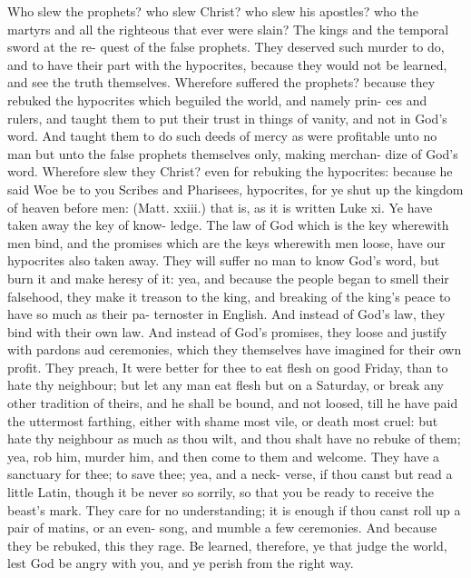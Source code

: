 \documentclass{custom}
\begin{document}
Who slew the prophets? who slew Christ? who slew his 
apostles? who the martyrs and all the righteous that ever 
were slain? The kings and the temporal sword at the re- 
quest of the false prophets. They deserved such murder 
to do, and to have their part with the hypocrites, because 
they would not be learned, and see the truth themselves. 
Wherefore suffered the prophets? because they rebuked 
the hypocrites which beguiled the world, and namely prin- 
ces and rulers, and taught them to put their trust in things 
of vanity, and not in God's word. And taught them to do 
such deeds of mercy as were profitable unto no man but 
unto the false prophets themselves only, making merchan- 
dize of God's word. Wherefore slew they Christ? even 
for rebuking the hypocrites: because he said Woe be to 
you Scribes and Pharisees, hypocrites, for ye shut up the 
kingdom of heaven before men: (Matt. xxiii.) that is, as it 
is written Luke xi. Ye have taken away the key of know- 
ledge. The law of God which is the key wherewith men 
bind, and the promises which are the keys wherewith 
men loose, have our hypocrites also taken away. They 
will suffer no man to know God's word, but burn it and 
make heresy of it: yea, and because the people began to 
smell their falsehood, they make it treason to the king, and 
breaking of the king's peace to have so much as their pa- 
ternoster in English. And instead of God's law, they bind 
with their own law. And instead of God's promises, they 
loose and justify with pardons aud ceremonies, which 
they themselves have imagined for their own profit. They 
preach, It were better for thee to eat flesh on good Friday, 
than to hate thy neighbour; but let any man eat flesh but 
on a Saturday, or break any other tradition of theirs, and 
he shall be bound, and not loosed, till he have paid the 
uttermost farthing, either with shame most vile, or death 
most cruel: but hate thy neighbour as much as thou wilt, 
and thou shalt have no rebuke of them; yea, rob him, 
murder him, and then come to them and welcome. They 
have a sanctuary for thee; to save thee; yea, and a neck- 
verse, if thou canst but read a little Latin, though 
it be never so sorrily, so that you be ready to receive the 
beast's mark. They care for no understanding; it is 
enough if thou canst roll up a pair of matins, or an even- 
song, and mumble a few ceremonies. And because they 
be rebuked, this they rage. Be learned, therefore, ye 
that judge the world, lest God be angry with you, and ye 
perish from the right way. 
\end{document}
